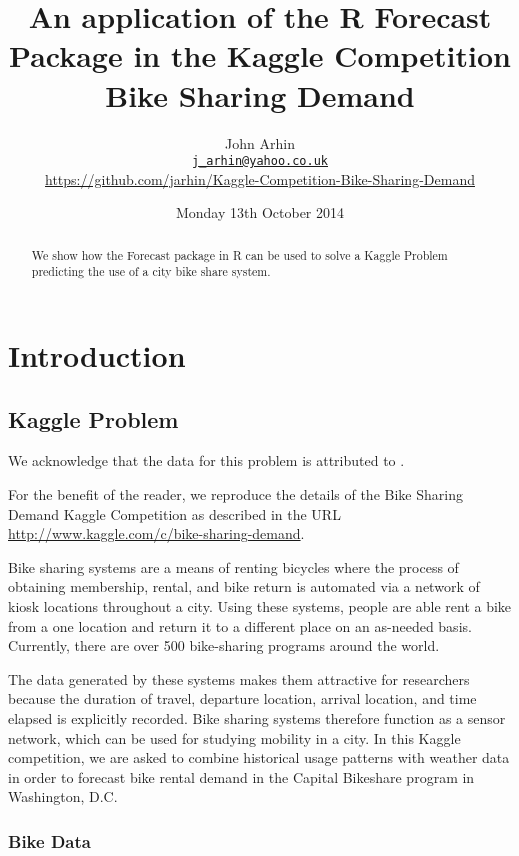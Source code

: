 \documentclass{article}
\begin{document}
\title{An application of the R Forecast Package in the Kaggle Competition Bike Sharing Demand}
\author{John Arhin\\
\texttt{\href{mailto:j_arhin@yahoo.co.uk}{j\_arhin@yahoo.co.uk}}\\
\url{https://github.com/jarhin/Kaggle-Competition-Bike-Sharing-Demand}}
\date{Monday 13th October 2014}
\maketitle

\begin{abstract}
 We show how the Forecast package in R can be used to solve a Kaggle Problem predicting the use of a city bike share system.
\end{abstract}


\section{Introduction}
\subsection{Kaggle Problem}

We acknowledge that the data for this problem is attributed to \cite{RProj}. 

For the benefit of the reader, we reproduce the details of the Bike Sharing Demand Kaggle Competition as described in the URL \url{http://www.kaggle.com/c/bike-sharing-demand}.

Bike sharing systems are a means of renting bicycles where the process of obtaining membership, rental, and bike return is automated via a network of kiosk locations throughout a city. Using these systems, people are able rent a bike from a one location and return it to a different place on an as-needed basis. Currently, there are over 500 bike-sharing programs around the world.

The data generated by these systems makes them attractive for researchers because the duration of travel, departure location, arrival location, and time elapsed is explicitly recorded. Bike sharing systems therefore function as a sensor network, which can be used for studying mobility in a city. In this Kaggle competition, we are asked to combine historical usage patterns with weather data in order to forecast bike rental demand in the Capital Bikeshare program in Washington, D.C.

\subsubsection{Bike Data}
\end{document}
